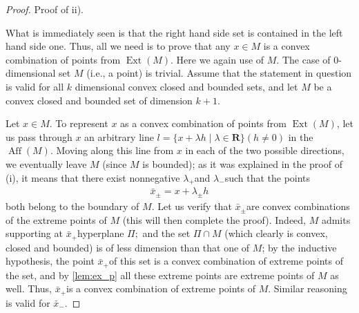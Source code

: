\documentclass{article}
\newcommand{\Aff}{\operatorname{Aff}}
\begin{document}
\begin{proof}
Proof of ii).

What is immediately seen is that the right hand side set is contained in the left hand side one. Thus, all we need is to prove that any $x \in M$ is a convex combination of points from $\operatorname{Ext}(M)$. Here we again use  of $M$. The case of $0$-dimensional set $M$ (i.e., a point) is trivial. Assume that the statement in question is valid for all $k$ dimensional convex closed and bounded sets, and let $M$ be a convex closed and bounded set of dimension $k+1$.

Let $x \in M$. To represent $x$ as a convex combination of points from $\operatorname{Ext}(M)$, let us pass through $x$ an arbitrary line $l=\{x+\lambda h \mid \lambda \in \mathbf{R}\}(h \neq 0)$ in the $\Aff (M)$. Moving along this line from $x$ in each of the two possible directions, we eventually leave $M$ (since $M$ is bounded); as it was explained in the proof of (i), it means that there exist nonnegative $\lambda_{+}$and $\lambda_{-}$such that the points
\begin{align*}
\bar{x}_{\pm}=x+\lambda_{\pm} h
\end{align*}
both belong to the boundary of $M$. Let us verify that $\bar{x}_{\pm}$are convex combinations of the extreme points of $M$ (this will then complete the proof). Indeed, $M$ admits supporting at $\bar{x}_{+}$hyperplane $\Pi ;$ and the set $\Pi \cap M$ (which clearly is convex, closed and bounded) is of less dimension than that one of $M$; by the inductive hypothesis, the point $\bar{x}_{+}$of this set is a convex combination of extreme points of the set, and by \cref{lem:ex_p} all these extreme points are extreme points of $M$ as well. Thus, $\bar{x}_{+}$is a convex combination of extreme points of $M$. Similar reasoning is valid for $\bar{x}_{-}$.
\end{proof}
\end{document}
